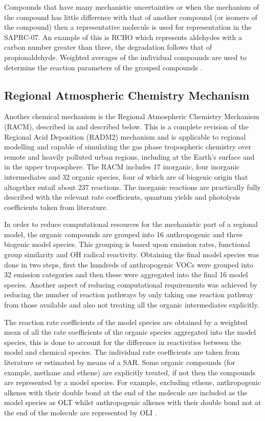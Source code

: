 Compounds that have many mechanistic uncertainties or when the mechanism of the compound has little difference with that of 
another compound (or isomers of the compound) then a representative molecule is used for representation in the SAPRC-07. An 
example of this is RCHO which represents aldehydes with a carbon number greater than three, the degradation follows that of 
propionaldehyde. Weighted averages of the individual compounds are used to determine the reaction parameters of the grouped 
compounds \citep{Carter:2010}.

\subsection{Regional Atmospheric Chemistry Mechanism}
Another chemical mechanism is the Regional Atmospheric Chemistry Mechanism (RACM), described in \citep{Stockwell:1997} and 
described below. This is a complete revision of the Regional Acid Deposition (RADM2) mechanism and is applicable to regional 
modelling and capable of simulating the gas phase tropospheric chemistry over remote and heavily polluted urban regions, 
including at the Earth's surface and in the upper troposphere. The RACM includes 17 inorganic, four inorganic intermediates and
32 organic species, four of which are of biogenic origin that altogether entail about 237 reactions. The inorganic reactions 
are practically fully described with the relevant rate coefficients, quantum yields and photolysis coefficients taken from 
literature.

In order to reduce computational resources for the mechanistic part of a regional model, the organic compounds are grouped into
16 anthropogenic and three biogenic model species. This grouping is based upon emission rates, functional group similarity and 
OH radical reactivity. Obtaining the final model species was done in two steps, first the hundreds of anthropogenic VOCs were 
grouped into 32 emission categories and then these were aggregated into the final 16 model species. Another aspect of reducing 
computational requirements was achieved by reducing the number of reaction pathways by only taking one reaction pathway from 
those available and also not treating all the organic intermediates explicitly.

The reaction rate coefficients of the model species are obtained by a weighted mean of all the rate coefficients of the organic
species aggregated into the model species, this is done to account for the difference in reactivities between the model and 
chemical species. The individual rate coefficients are taken from literature or estimated by means of a SAR. Some organic 
compounds (for example, methane and ethene) are explicitly treated, if not then the compounds are represented by a model 
species. For example, excluding ethene, anthropogenic alkenes with their double bond at the end of the molecule are included as
the model species as OLT whilst anthropogenic alkenes with their double bond not at the end of the molecule are represented by 
OLI \citep{Stockwell:1997}.

